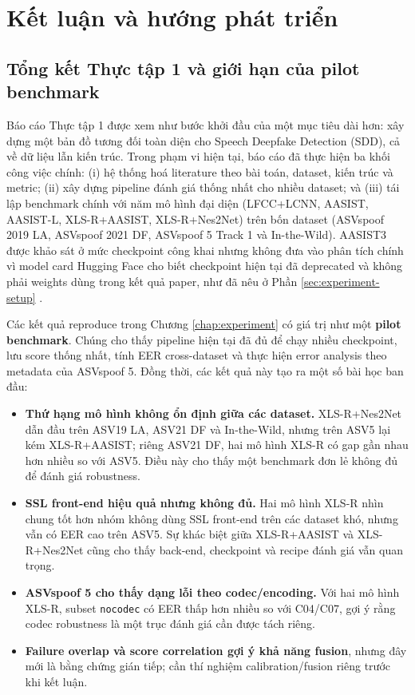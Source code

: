 \chapter{Kết luận và hướng phát triển} \label{chap:conclusion}

\section{Tổng kết Thực tập 1 và giới hạn của pilot benchmark}

Báo cáo Thực tập 1 được xem như bước khởi đầu của một mục tiêu dài hơn: xây dựng một bản đồ tương đối toàn diện cho Speech Deepfake Detection (SDD), cả về dữ liệu lẫn kiến trúc. Trong phạm vi hiện tại, báo cáo đã thực hiện ba khối công việc chính: (i) hệ thống hoá literature theo bài toán, dataset, kiến trúc và metric; (ii) xây dựng pipeline đánh giá thống nhất cho nhiều dataset; và (iii) tái lập benchmark chính với năm mô hình đại diện (LFCC+LCNN, AASIST, AASIST-L, XLS-R+AASIST, XLS-R+Nes2Net) trên bốn dataset (ASVspoof 2019 LA, ASVspoof 2021 DF, ASVspoof 5 Track 1 và In-the-Wild). AASIST3 được khảo sát ở mức checkpoint công khai nhưng không đưa vào phân tích chính vì model card Hugging Face cho biết checkpoint hiện tại đã deprecated và không phải weights dùng trong kết quả paper, như đã nêu ở Phần \ref{sec:experiment-setup} \cite{aasist3_hf}.

Các kết quả reproduce trong Chương \ref{chap:experiment} có giá trị như một \textbf{pilot benchmark}. Chúng cho thấy pipeline hiện tại đã đủ để chạy nhiều checkpoint, lưu score thống nhất, tính EER cross-dataset và thực hiện error analysis theo metadata của ASVspoof 5. Đồng thời, các kết quả này tạo ra một số bài học ban đầu:

\begin{itemize}
    \item \textbf{Thứ hạng mô hình không ổn định giữa các dataset.} XLS-R+Nes2Net dẫn đầu trên ASV19 LA, ASV21 DF và In-the-Wild, nhưng trên ASV5 lại kém XLS-R+AASIST; riêng ASV21 DF, hai mô hình XLS-R có gap gần nhau hơn nhiều so với ASV5. Điều này cho thấy một benchmark đơn lẻ không đủ để đánh giá robustness.
    \item \textbf{SSL front-end hiệu quả nhưng không đủ.} Hai mô hình XLS-R nhìn chung tốt hơn nhóm không dùng SSL front-end trên các dataset khó, nhưng vẫn có EER cao trên ASV5. Sự khác biệt giữa XLS-R+AASIST và XLS-R+Nes2Net cũng cho thấy back-end, checkpoint và recipe đánh giá vẫn quan trọng.
    \item \textbf{ASVspoof 5 cho thấy dạng lỗi theo codec/encoding.} Với hai mô hình XLS-R, subset \texttt{nocodec} có EER thấp hơn nhiều so với C04/C07, gợi ý rằng codec robustness là một trục đánh giá cần được tách riêng.
    \item \textbf{Failure overlap và score correlation gợi ý khả năng fusion}, nhưng đây mới là bằng chứng gián tiếp; cần thí nghiệm calibration/fusion riêng trước khi kết luận.
\end{itemize}


